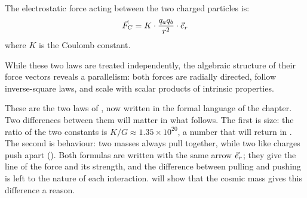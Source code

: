 \begin{definition}\label{def:coulomb}
The electrostatic force acting between the two charged particles is:
\[
\vec{F}_C = K \cdot \frac{q_a q_b}{r^2} \cdot \vec{e}_r
\]
where $K$ is the Coulomb constant.
\end{definition}

While these two laws are treated independently, the algebraic structure of their force vectors reveals a parallelism: both forces are radially directed, follow inverse-square laws, and scale with scalar products of intrinsic properties.

\begin{plainwords}
These are the two laws of , now written in the formal language of the chapter. Two differences between them will matter in what follows. The first is size: the ratio of the two constants is $K/G \approx 1.35 \times 10^{20}$, a number that will return in . The second is behaviour: two masses always pull together, while two like charges push apart (). Both formulas are written with the same arrow $\vec{e}_r$; they give the line of the force and its strength, and the difference between pulling and pushing is left to the nature of each interaction.  will show that the cosmic mass gives this difference a reason.
\end{plainwords}

